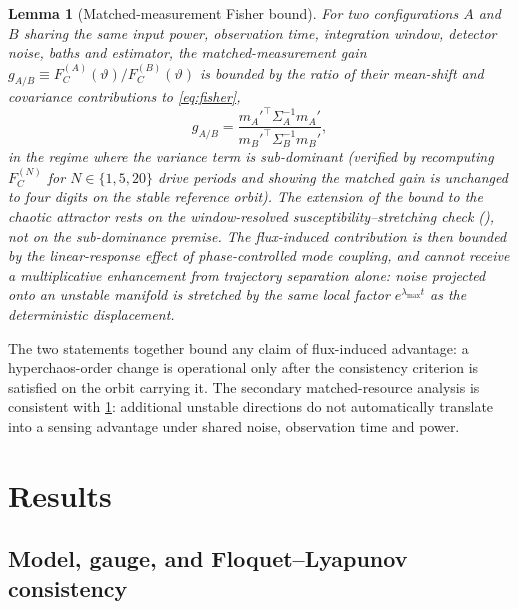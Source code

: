 \documentclass[preprint,numbers,a4paper]{elsarticle}
\newtheorem{lemma}{Lemma}
\begin{document}
\begin{lemma}[Matched-measurement Fisher bound]
\label{lem:matched-fisher}
For two configurations $A$ and $B$ sharing the same input power, observation time, integration window, detector noise, baths and estimator, the matched-measurement gain $g_{A/B}\equiv F_C^{(A)}(\vartheta)/F_C^{(B)}(\vartheta)$ is bounded by the ratio of their mean-shift and covariance contributions to \cref{eq:fisher},
\begin{equation}
g_{A/B}=\frac{m_A'^{\!\top}\Sigma_A^{-1}m_A'}{m_B'^{\!\top}\Sigma_B^{-1}m_B'},
\end{equation}
in the regime where the variance term is sub-dominant (verified by recomputing $F_C^{(N)}$ for $N\in\{1,5,20\}$ drive periods and showing the matched gain is unchanged to four digits on the stable reference orbit). The extension of the bound to the chaotic attractor rests on the window-resolved susceptibility--stretching check (), not on the sub-dominance premise. The flux-induced contribution is then bounded by the linear-response effect of phase-controlled mode coupling, and cannot receive a multiplicative enhancement from trajectory separation alone: noise projected onto an unstable manifold is stretched by the same local factor $e^{\lambda_{\max}t}$ as the deterministic displacement.
\end{lemma}

The two statements together bound any claim of flux-induced advantage: a hyperchaos-order change is operational only after the consistency criterion is satisfied on the orbit carrying it. The secondary matched-resource analysis is consistent with \cref{lem:matched-fisher}: additional unstable directions do not automatically translate into a sensing advantage under shared noise, observation time and power.

\section{Results}
\label{sec:results}

\subsection{Model, gauge, and Floquet--Lyapunov consistency}
\end{document}

